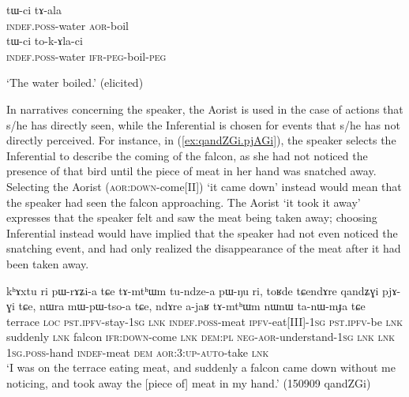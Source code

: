\begin{exe}
\ex 
\begin{xlist}
\ex \label{ex:tWci.tala}
\gll tɯ-ci tɤ-ala \\
\textsc{indef}.\textsc{poss}-water \textsc{aor}-boil  \\
\ex \label{ex:tWci.tokAlaci}
\gll tɯ-ci to-k-ɤla-ci  \\
\textsc{indef}.\textsc{poss}-water \textsc{ifr}-\textsc{peg}-boil-\textsc{peg} \\
\end{xlist}
\glt `The water boiled.' (elicited)
\end{exe}

In narratives concerning the speaker, the Aorist is used in the case of actions that s/he has directly seen, while the Inferential is chosen for events that s/he has not directly perceived. For instance, in (\ref{ex:qandZGi.pjAGi}), the speaker selects the Inferential  to describe the coming of the falcon, as she had not noticed the presence of that bird until the piece of meat in her hand was snatched away. Selecting the Aorist  (\textsc{aor}:\textsc{down}-come[II]) `it came down' instead would mean that the speaker had seen the falcon approaching.  The Aorist  `it took it away' expresses that the speaker felt and saw the meat being taken away; choosing  Inferential  instead would have implied that the speaker had not even noticed the snatching event, and had only realized the disappearance of the meat after it had been taken away.


\begin{exe}
\ex \label{ex:qandZGi.pjAGi}
\gll   kʰɤxtu ri pɯ-rɤʑi-a tɕe tɤ-mtʰɯm tu-ndze-a pɯ-ŋu ri, toʁde tɕendɤre qandʑɣi pjɤ-ɣi tɕe, nɯra mɯ-pɯ-tso-a tɕe, ndɤre a-jaʁ tɤ-mtʰɯm nɯnɯ ta-nɯ-mɟa tɕe \\
terrace \textsc{loc} \textsc{pst}.\textsc{ipfv}-stay-\textsc{1sg} \textsc{lnk} \textsc{indef}.\textsc{poss}-meat \textsc{ipfv}-eat[III]-\textsc{1sg} \textsc{pst}.\textsc{ipfv}-be \textsc{lnk} suddenly \textsc{lnk} falcon \textsc{ifr}:\textsc{down}-come \textsc{lnk} \textsc{dem}:\textsc{pl} \textsc{neg}-\textsc{aor}-understand-\textsc{1sg} \textsc{lnk} \textsc{lnk} \textsc{1sg}.\textsc{poss}-hand \textsc{indef}-meat \textsc{dem} \textsc{aor}:3\flobv{}:\textsc{up}-\textsc{auto}-take \textsc{lnk} \\
\glt `I was on the terrace eating meat, and suddenly a falcon came down without me noticing, and took away the [piece of] meat in my hand.' (150909 qandZGi) 
 \end{exe}

